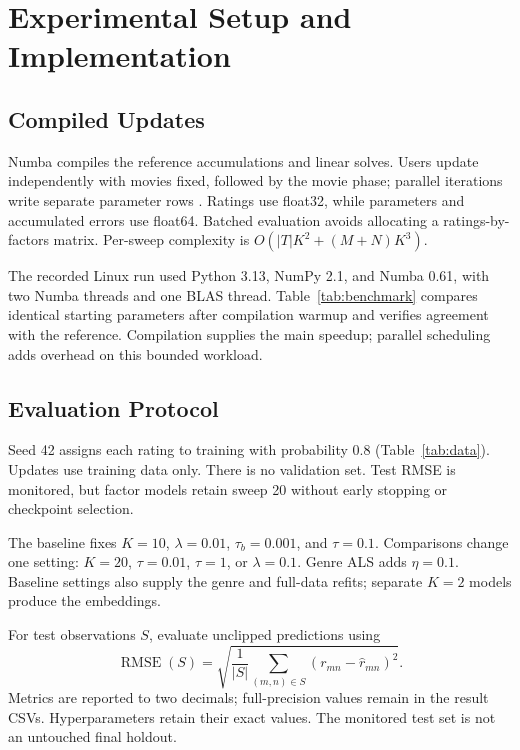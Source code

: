 \section{Experimental Setup and Implementation}
\subsection{Compiled Updates}
Numba compiles the reference accumulations and linear solves. Users update independently with movies fixed, followed by the movie phase; parallel iterations write separate parameter rows \citep{numbaParallel}. Ratings use float32, while parameters and accumulated errors use float64. Batched evaluation avoids allocating a ratings-by-factors matrix. Per-sweep complexity is $O(|T|K^2+(M+N)K^3)$.

The recorded Linux run used Python 3.13, NumPy 2.1, and Numba 0.61, with two Numba threads and one BLAS thread. Table~\ref{tab:benchmark} compares identical starting parameters after compilation warmup and verifies agreement with the reference. Compilation supplies the main speedup; parallel scheduling adds overhead on this bounded workload.

\begin{table}[H]
\caption{One user-side update on 64,301 ratings, $K=10$. Medians of three timings after warmup.}
\label{tab:benchmark}\centering\small
\end{table}

\subsection{Evaluation Protocol}
Seed 42 assigns each rating to training with probability 0.8 (Table~\ref{tab:data}). Updates use training data only. There is no validation set. Test RMSE is monitored, but factor models retain sweep 20 without early stopping or checkpoint selection.

The baseline fixes $K=10$, $\lambda=0.01$, $\tau_b=0.001$, and $\tau=0.1$. Comparisons change one setting: $K=20$, $\tau=0.01$, $\tau=1$, or $\lambda=0.1$. Genre ALS adds $\eta=0.1$. Baseline settings also supply the genre and full-data refits; separate $K=2$ models produce the embeddings.

For test observations $S$, evaluate unclipped predictions using
\begin{equation}
\operatorname{RMSE}(S)=\sqrt{\frac{1}{|S|}\sum_{(m,n)\in S}(r_{mn}-\widehat r_{mn})^2}.
\end{equation}
Metrics are reported to two decimals; full-precision values remain in the result CSVs. Hyperparameters retain their exact values. The monitored test set is not an untouched final holdout.

